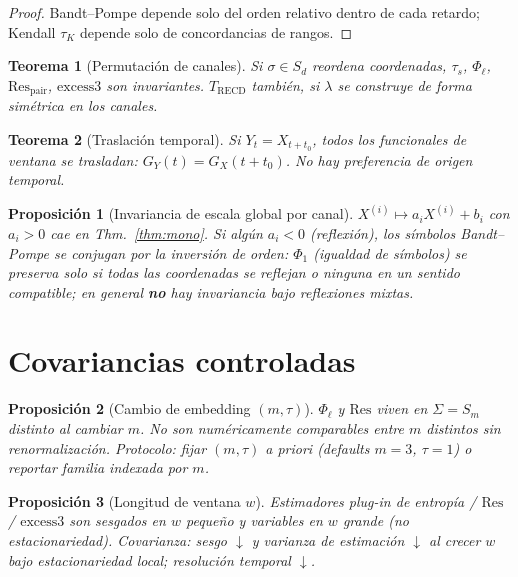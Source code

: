 \documentclass[11pt,a4paper]{article}
\theoremstyle{definition}
\theoremstyle{plain}
\newtheorem{proposition}{Proposici\'on}[section]
\newtheorem{theorem}{Teorema}[section]
\theoremstyle{remark}
\newcommand{\Res}{\mathrm{Res}}
\newcommand{\RECD}{\mathrm{RECD}}
\newcommand{\excess}{\mathrm{excess3}}
\newcommand{\ts}{\tau_s}
\begin{document}
\begin{proof}
Bandt--Pompe depende solo del orden relativo dentro de cada retardo;
Kendall $\tau_K$ depende solo de concordancias de rangos.
\end{proof}

\begin{theorem}[Permutaci\'on de canales]
\label{thm:perm}
Si $\sigma\in S_d$ reordena coordenadas,
$\ts$, $\Phi_\ell$, $\Res_{\mathrm{pair}}$, $\excess$ son invariantes.
$T_{\RECD}$ tambi\'en, si $\lambda$ se construye de forma sim\'etrica en
los canales.
\end{theorem}

\begin{theorem}[Traslaci\'on temporal]
\label{thm:shift}
Si $Y_t=X_{t+t_0}$, todos los funcionales de ventana se trasladan:
$G_Y(t)=G_X(t+t_0)$. No hay preferencia de origen temporal.
\end{theorem}

\begin{proposition}[Invariancia de escala global por canal]
\label{prop:scale}
$X^{(i)}\mapsto a_i X^{(i)}+b_i$ con $a_i>0$ cae en
Thm.~\ref{thm:mono}. Si alg\'un $a_i<0$ (reflexi\'on), los s\'imbolos
Bandt--Pompe se conjugan por la inversi\'on de orden: $\Phi_1$ (igualdad
de s\'imbolos) se preserva solo si \emph{todas} las coordenadas se
reflejan o ninguna en un sentido compatible; en general
\textbf{no} hay invariancia bajo reflexiones mixtas.
\end{proposition}

\section{Covariancias controladas}
\label{sec:cov}

\begin{proposition}[Cambio de embedding $(m,\tau)$]
\label{prop:embed}
$\Phi_\ell$ y $\Res$ viven en $\Sigma=S_m$ distinto al cambiar $m$. No
son num\'ericamente comparables entre $m$ distintos sin renormalizaci\'on.
Protocolo: fijar $(m,\tau)$ a priori (defaults $m=3$, $\tau=1$) o
reportar familia indexada por $m$.
\end{proposition}

\begin{proposition}[Longitud de ventana $w$]
\label{prop:w}
Estimadores plug-in de entrop\'ia / $\Res$ / $\excess$ son sesgados en
$w$ peque\~no y variables en $w$ grande (no estacionariedad). Covarianza:
sesgo $\downarrow$ y varianza de estimaci\'on $\downarrow$ al crecer $w$
bajo estacionariedad local; resoluci\'on temporal $\downarrow$.
\end{proposition}
\end{document}
